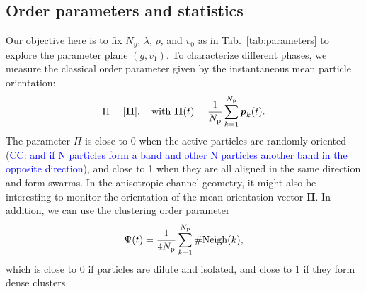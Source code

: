 \documentclass[aps,prl,twocolumn,amsmath,amssymb,superscriptaddress]{revtex4-1}
\newcommand{\CC}[1]
{\textcolor{blue}{#1}}
\begin{document}
\subsection{Order parameters and statistics}
Our objective here is to fix $N_y$, $\lambda$, $\rho$, and $v_0$ as in Tab.~\ref{tab:parameters} to explore the parameter plane $(g,v_1)$. To characterize different phases, we measure the classical order parameter given by the instantaneous mean particle orientation:
\begin{equation}
\Pi = |\boldsymbol{\Pi}|, \quad\mbox{with } \boldsymbol{\Pi}(t) = \frac{1}{N_{\rm p}}\sum_{k=1}^{N_{\rm p}} \boldsymbol{p}_{k}(t).
\label{eq:defPhia}
\end{equation}
The parameter $\Pi$  is close to 0 when the active particles are randomly oriented (\CC{CC: and if N particles form a band and other N particles another band in the opposite direction}), and close to 1 when they are all aligned in the same direction and form swarms. In the anisotropic channel geometry, it might also be interesting to monitor the orientation of the mean orientation vector $\boldsymbol{\Pi}$. In addition, we can use the clustering order parameter
\begin{equation}
\Psi(t) = \frac{1}{4N_{\rm p}}\sum_{k=1}^{N_{\rm p}} \# {\rm Neigh}(k),
\end{equation}
which is close to 0 if particles are dilute and isolated, and close to 1 if they form dense clusters.
\end{document}

